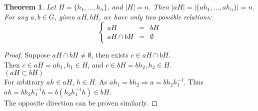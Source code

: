 \documentclass{article}
\theoremstyle{MyNonumberplain}
\theoremstyle{break}
\newtheorem*{proof}{Proof. }
\theoremstyle{break}
\newtheorem{theorem}{Theorem}[section]
\theoremstyle{break}
\theoremstyle{definition}
\theoremstyle{break}
\begin{document}
\begin{thmbox}
    \begin{theorem}
        Let $H = \{ h_1, \ldots, h_n \}$, and $| H | = n$. Then $| a H | = | \{ a h_1,
        \ldots, a h_n \} | = n$. For any $a, b \in G$, given $a H, b H$, we have only two possible relations:
        $$\left\{\begin{array}{lll}
        a H & = & b H\\
        a H \cap b H & = & \emptyset
        \end{array}\right.$$
    \end{theorem}
    \begin{prfbox}
        \begin{proof}
            Suppose $a H \cap b H \neq \emptyset$, then exists $c \in a H \cap b H$.\\

            Then $c \in a H = a h_1, h_1 \in H$, and $c \in b H = b h_2, h_2 \in H$.\\
            
            $(a H \subset b H)$\\
            
            For arbitrary $a h \in a H$, $h \in H$. As $a h_1 = b h_2 \Rightarrow a = b
            h_2 h^{- 1}_1$. Thus $a h = b h_2 h^{- 1}_1 h = b (h_2 h^{- 1}_1 h) \in b H$.\\
            
            The opposite direction can be proven similarly. 
        \end{proof}
    \end{prfbox}
\end{thmbox}
\end{document}
